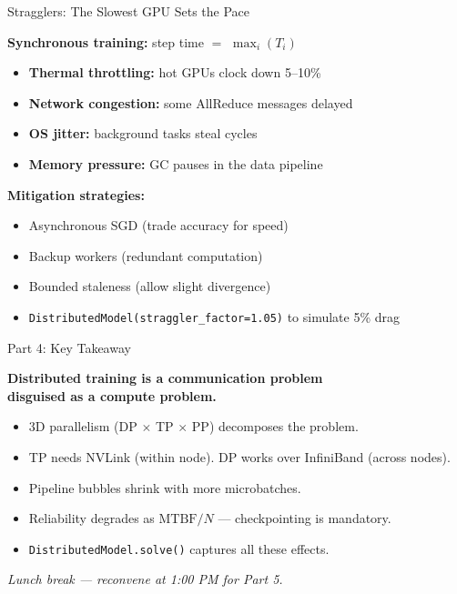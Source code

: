 \documentclass[aspectratio=169, 12pt]{beamer}
\begin{document}
\begin{frame}{Stragglers: The Slowest GPU Sets the Pace}

\small
\textbf{Synchronous training:} step time $=$ $\max_i(T_i)$

\vspace{0.2cm}
\begin{itemize}\setlength\itemsep{2pt}
  \item \textbf{Thermal throttling:} hot GPUs clock down 5--10\%
  \item \textbf{Network congestion:} some AllReduce messages delayed
  \item \textbf{OS jitter:} background tasks steal cycles
  \item \textbf{Memory pressure:} GC pauses in the data pipeline
\end{itemize}

\vspace{0.3cm}
\textbf{Mitigation strategies:}
\begin{itemize}\setlength\itemsep{2pt}
  \item Asynchronous SGD (trade accuracy for speed)
  \item Backup workers (redundant computation)
  \item Bounded staleness (allow slight divergence)
  \item \texttt{DistributedModel(straggler\_factor=1.05)} to simulate 5\% drag
\end{itemize}
\end{frame}

\begin{frame}{Part 4: Key Takeaway}

\centering\Large

\textbf{Distributed training is a communication problem\\
disguised as a compute problem.}\\[0.5cm]

\normalsize
\begin{itemize}
  \item 3D parallelism (DP $\times$ TP $\times$ PP) decomposes the problem.
  \item TP needs NVLink (within node). DP works over InfiniBand (across nodes).
  \item Pipeline bubbles shrink with more microbatches.
  \item Reliability degrades as $\text{MTBF}/N$ --- checkpointing is mandatory.
  \item \texttt{DistributedModel.solve()} captures all these effects.
\end{itemize}

\vspace{0.5cm}
\centering
\textit{Lunch break --- reconvene at 1:00 PM for Part 5.}
\end{frame}
\end{document}
